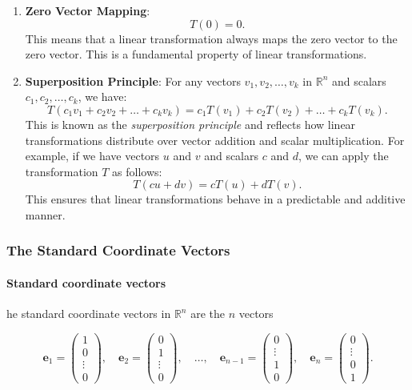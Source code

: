 \documentclass[a4paper,12pt]{article}
\begin{document}
\begin{enumerate}
    \item \textbf{Zero Vector Mapping}:
    \[
    T(0) = 0.
    \]
    This means that a linear transformation always maps the zero vector to the zero vector. This is a fundamental property of linear transformations.

    \item \textbf{Superposition Principle}: For any vectors $v_1, v_2, \dots, v_k$ in $\mathbb{R}^n$ and scalars $c_1, c_2, \dots, c_k$, we have:
    \[
    T(c_1v_1 + c_2v_2 + \dots + c_kv_k) = c_1T(v_1) + c_2T(v_2) + \dots + c_kT(v_k).
    \]
    This is known as the \textit{superposition principle} and reflects how linear transformations distribute over vector addition and scalar multiplication. For example, if we have vectors $u$ and $v$ and scalars $c$ and $d$, we can apply the transformation $T$ as follows:
    \[
    T(cu + dv) = cT(u) + dT(v).
    \]
    This ensures that linear transformations behave in a predictable and additive manner.
\end{enumerate}

\subsubsection{The Standard Coordinate Vectors}
\paragraph{Standard coordinate vectors}
he standard coordinate vectors in $\mathbb{R}^n$ are the $n$ vectors

\[
\mathbf{e}_1 = \begin{pmatrix} 1 \\ 0 \\ \vdots \\ 0 \end{pmatrix}, \quad 
\mathbf{e}_2 = \begin{pmatrix} 0 \\ 1 \\ \vdots \\ 0 \end{pmatrix}, \quad \dots, \quad
\mathbf{e}_{n-1} = \begin{pmatrix} 0 \\ \vdots \\ 1 \\ 0 \end{pmatrix}, \quad
\mathbf{e}_n = \begin{pmatrix} 0 \\ \vdots \\ 0 \\ 1 \end{pmatrix}.
\]
\end{document}
